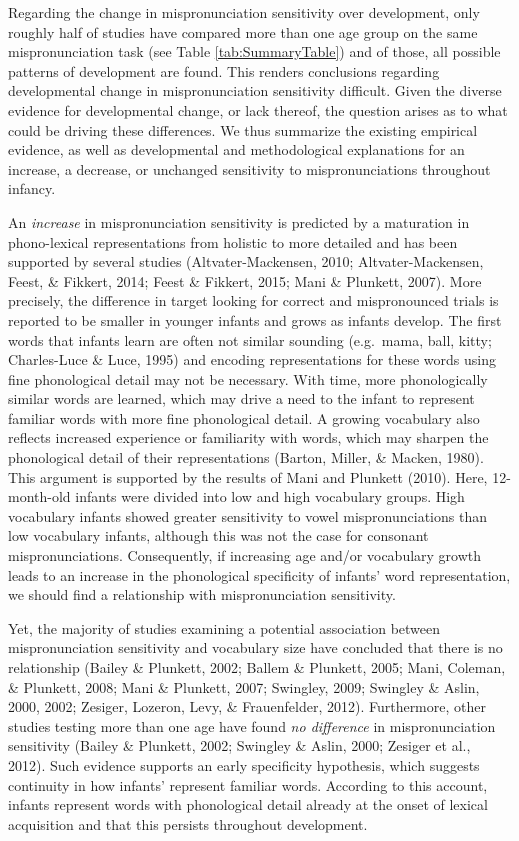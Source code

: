 \documentclass[man]{apa6}
\begin{document}
Regarding the change in mispronunciation sensitivity over development, only roughly half of studies have compared more than one age group on the same mispronunciation task (see Table \ref{tab:SummaryTable}) and of those, all possible patterns of development are found. This renders conclusions regarding developmental change in mispronunciation sensitivity difficult. Given the diverse evidence for developmental change, or lack thereof, the question arises as to what could be driving these differences. We thus summarize the existing empirical evidence, as well as developmental and methodological explanations for an increase, a decrease, or unchanged sensitivity to mispronunciations throughout infancy.

An \emph{increase} in mispronunciation sensitivity is predicted by a maturation in phono-lexical representations from holistic to more detailed and has been supported by several studies (Altvater-Mackensen, 2010; Altvater-Mackensen, Feest, \& Fikkert, 2014; Feest \& Fikkert, 2015; Mani \& Plunkett, 2007). More precisely, the difference in target looking for correct and mispronounced trials is reported to be smaller in younger infants and grows as infants develop. The first words that infants learn are often not similar sounding (e.g.~mama, ball, kitty; Charles-Luce \& Luce, 1995) and encoding representations for these words using fine phonological detail may not be necessary. With time, more phonologically similar words are learned, which may drive a need to the infant to represent familiar words with more fine phonological detail. A growing vocabulary also reflects increased experience or familiarity with words, which may sharpen the phonological detail of their representations (Barton, Miller, \& Macken, 1980). This argument is supported by the results of Mani and Plunkett (2010). Here, 12-month-old infants were divided into low and high vocabulary groups. High vocabulary infants showed greater sensitivity to vowel mispronunciations than low vocabulary infants, although this was not the case for consonant mispronunciations. Consequently, if increasing age and/or vocabulary growth leads to an increase in the phonological specificity of infants' word representation, we should find a relationship with mispronunciation sensitivity.

Yet, the majority of studies examining a potential association between mispronunciation sensitivity and vocabulary size have concluded that there is no relationship (Bailey \& Plunkett, 2002; Ballem \& Plunkett, 2005; Mani, Coleman, \& Plunkett, 2008; Mani \& Plunkett, 2007; Swingley, 2009; Swingley \& Aslin, 2000, 2002; Zesiger, Lozeron, Levy, \& Frauenfelder, 2012). Furthermore, other studies testing more than one age have found \emph{no difference} in mispronunciation sensitivity (Bailey \& Plunkett, 2002; Swingley \& Aslin, 2000; Zesiger et al., 2012). Such evidence supports an early specificity hypothesis, which suggests continuity in how infants' represent familiar words. According to this account, infants represent words with phonological detail already at the onset of lexical acquisition and that this persists throughout development.
\end{document}
